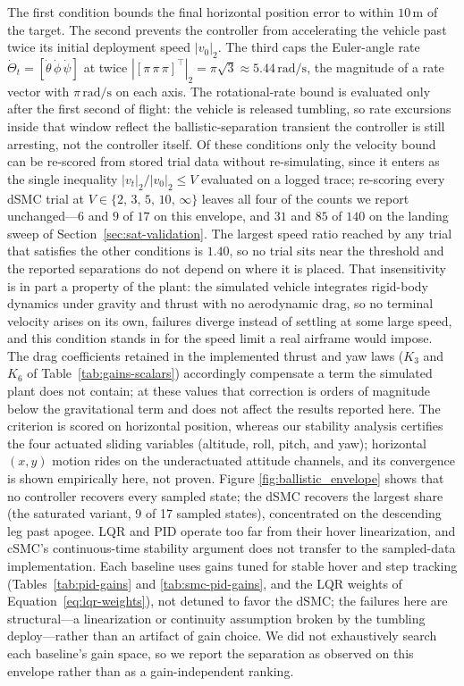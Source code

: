 \documentclass[conf]{new-aiaa}
\begin{document}
The first condition bounds the final horizontal position error to within $10\,\text{m}$ of the target. The second prevents the controller from accelerating the vehicle past twice its initial deployment speed $|v_0|_2$. The third caps the Euler-angle rate $\dot\Theta_t=[\dot\theta\,\dot\phi\,\dot\psi]$ at twice $|[\pi\,\pi\,\pi]^{\top}|_2 = \pi\sqrt{3} \approx 5.44\,\text{rad/s}$, the magnitude of a rate vector with $\pi\,\text{rad/s}$ on each axis. The rotational-rate bound is evaluated only after the first second of flight: the vehicle is released tumbling, so rate excursions inside that window reflect the ballistic-separation transient the controller is still arresting, not the controller itself. Of these conditions only the velocity bound can be re-scored from stored trial data without re-simulating, since it enters as the single inequality $|v_t|_2/|v_0|_2 \le V$ evaluated on a logged trace; re-scoring every dSMC trial at $V \in \{2,\,3,\,5,\,10,\,\infty\}$ leaves all four of the counts we report unchanged---$6$ and $9$ of $17$ on this envelope, and $31$ and $85$ of $140$ on the landing sweep of Section~\ref{sec:sat-validation}. The largest speed ratio reached by any trial that satisfies the other conditions is $1.40$, so no trial sits near the threshold and the reported separations do not depend on where it is placed. That insensitivity is in part a property of the plant: the simulated vehicle integrates rigid-body dynamics under gravity and thrust with no aerodynamic drag, so no terminal velocity arises on its own, failures diverge instead of settling at some large speed, and this condition stands in for the speed limit a real airframe would impose. The drag coefficients retained in the implemented thrust and yaw laws ($K_3$ and $K_6$ of Table~\ref{tab:gains-scalars}) accordingly compensate a term the simulated plant does not contain; at these values that correction is orders of magnitude below the gravitational term and does not affect the results reported here. The criterion is scored on horizontal position, whereas our stability analysis certifies the four actuated sliding variables (altitude, roll, pitch, and yaw); horizontal $(x,y)$ motion rides on the underactuated attitude channels, and its convergence is shown empirically here, not proven. Figure \ref{fig:ballistic_envelope} shows that no controller recovers every sampled state; the dSMC recovers the largest share (the saturated variant, 9 of 17 sampled states), concentrated on the descending leg past apogee. LQR and PID operate too far from their hover linearization, and cSMC’s continuous-time stability argument does not transfer to the sampled-data implementation. Each baseline uses gains tuned for stable hover and step tracking (Tables~\ref{tab:pid-gains} and \ref{tab:smc-pid-gains}, and the LQR weights of Equation~\ref{eq:lqr-weights}), not detuned to favor the dSMC; the failures here are structural---a linearization or continuity assumption broken by the tumbling deploy---rather than an artifact of gain choice. We did not exhaustively search each baseline's gain space, so we report the separation as observed on this envelope rather than as a gain-independent ranking.
\end{document}
